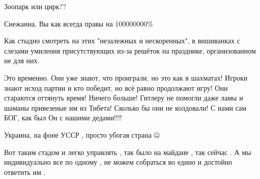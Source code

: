 \begin{itemize}
Зоопарк или цирк??

 
Снежанна, Вы как всегда правы на 100000000\%

 
Как стыдно смотреть на этих "незалежных и нескоренных", в вишиванках с слезами
умиления присутствующих из-за решёток на празднике, организованном не для них.

 

Это временно. Они уже знают, что проиграли, но это как в шахматах! Игроки знают
исход партии и кто победит, но всё равно продолжают игру! Они стараются
оттянуть время! Ничего больше! Гитлеру не помогли даже ламы и шаманы привезеные
им из Тибета! Сколько бы они не колдовали! С нами сам БОГ, как был Он с нашими
дедами!!!!

 
Украина, на фоне УССР , просто убогая страна 🤐

 

Вот таким стадом и легко управлять , так было на майдане , так сейчас . А мы
индивидуально все по одному , не можем собраться во едино и достойно ответить
им .


 

\end{itemize}
